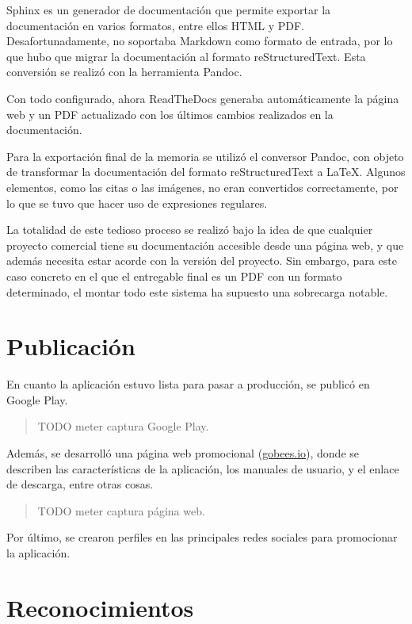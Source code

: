 Sphinx es un generador de documentación que permite exportar la
documentación en varios formatos, entre ellos HTML y PDF.
Desafortunadamente, no soportaba Markdown como formato de entrada, por
lo que hubo que migrar la documentación al formato reStructuredText.
Esta conversión se realizó con la herramienta Pandoc.

Con todo configurado, ahora ReadTheDocs generaba automáticamente la
página web y un PDF actualizado con los últimos cambios realizados en la
documentación.


Para la exportación final de la memoria se utilizó el conversor Pandoc,
con objeto de transformar la documentación del formato reStructuredText
a \LaTeX. Algunos elementos, como las citas o las imágenes, no eran
convertidos correctamente, por lo que se tuvo que hacer uso de
expresiones regulares.

La totalidad de este tedioso proceso se realizó bajo la idea de que
cualquier proyecto comercial tiene su documentación accesible desde una
página web, y que además necesita estar acorde con la versión del
proyecto. Sin embargo, para este caso concreto en el que el entregable
final es un PDF con un formato determinado, el montar todo este sistema
ha supuesto una sobrecarga notable.

\section{Publicación}\label{publicacion}

En cuanto la aplicación estuvo lista para pasar a producción, se publicó
en Google Play.

\begin{quote}
TODO meter captura Google Play.
\end{quote}

Además, se desarrolló una página web promocional
(\href{http://gobees.io/}{gobees.io}), donde se describen las
características de la aplicación, los manuales de usuario, y el enlace
de descarga, entre otras cosas.

\begin{quote}
TODO meter captura página web.
\end{quote}

Por último, se crearon perfiles en las principales redes sociales para
promocionar la aplicación.

\section{Reconocimientos}\label{reconocimientos}

